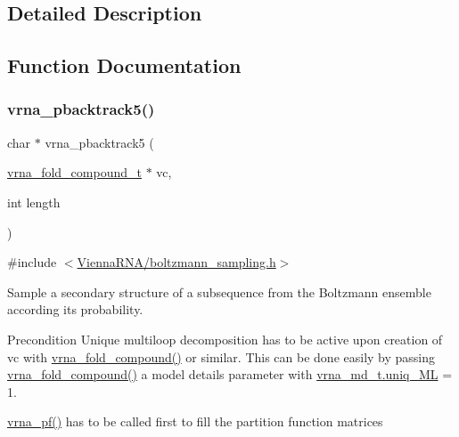 \subsection{Detailed Description}


\subsection{Function Documentation}
\mbox{\label{group__subopt__stochbt_ga347375a4da8bdff74639529847f97d4f}} 
\subsubsection{\texorpdfstring{vrna\+\_\+pbacktrack5()}{vrna\_pbacktrack5()}}
{\footnotesize\ttfamily char $\ast$ vrna\+\_\+pbacktrack5 (\begin{DoxyParamCaption}\item[{\hyperlink{group__fold__compound_ga1b0cef17fd40466cef5968eaeeff6166}{vrna\+\_\+fold\+\_\+compound\+\_\+t} $\ast$}]{vc,  }\item[{int}]{length }\end{DoxyParamCaption})}



{\ttfamily \#include $<$\hyperlink{boltzmann__sampling_8h}{Vienna\+R\+N\+A/boltzmann\+\_\+sampling.\+h}$>$}



Sample a secondary structure of a subsequence from the Boltzmann ensemble according its probability. 

\begin{DoxyPrecond}{Precondition}
Unique multiloop decomposition has to be active upon creation of {\ttfamily vc} with \hyperlink{group__fold__compound_ga6601d994ba32b11511b36f68b08403be}{vrna\+\_\+fold\+\_\+compound()} or similar. This can be done easily by passing \hyperlink{group__fold__compound_ga6601d994ba32b11511b36f68b08403be}{vrna\+\_\+fold\+\_\+compound()} a model details parameter with \hyperlink{group__model__details_ade065b814a4e2e72ead93ab502613ed2}{vrna\+\_\+md\+\_\+t.\+uniq\+\_\+\+ML} = 1. 

\hyperlink{group__pf__fold_ga29e256d688ad221b78d37f427e0e99bc}{vrna\+\_\+pf()} has to be called first to fill the partition function matrices
\end{DoxyPrecond}

